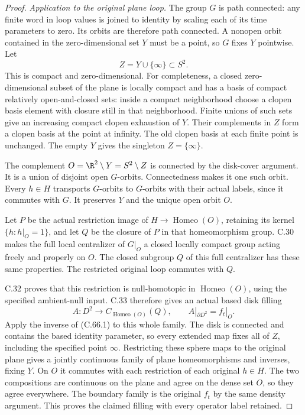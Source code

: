 \begin{proof}
\emph{Application to the original plane loop.}
The group $G$ is path connected: any finite word
in loop values is joined to identity by scaling
each of its time parameters to zero. Its orbits
are therefore path connected. A nonopen orbit
contained in the zero-dimensional set $Y$
must be a point, so $G$ fixes $Y$ pointwise.
Let
\[
                  Z=Y\cup\{\infty\}\subset S^2 .
                                                               \tag{C.66.6}
\]
This is compact and zero-dimensional. For
completeness, a closed zero-dimensional subset
of the plane is locally compact and has a basis
of compact relatively open-and-closed sets:
inside a compact neighborhood choose a clopen
basis element with closure still in that
neighborhood. Finite unions of such sets give
an increasing compact clopen exhaustion of $Y$.
Their complements in $Z$ form a clopen basis
at the point at infinity. The old clopen basis
at each finite point is unchanged. The empty
$Y$ gives the singleton $Z=\{\infty\}$.

The complement $O=\R^2\setminus Y=S^2\setminus Z$
is connected by the disk-cover argument.
It is a union of disjoint open $G$-orbits.
Connectedness makes it one such orbit.
Every $h\in H$ transports $G$-orbits to $G$-orbits
with their actual labels, since it commutes
with $G$. It preserves $Y$ and the unique open
orbit $O$.

Let $P$ be the actual restriction image of
$H\to\operatorname{Homeo}(O)$, retaining its
kernel $\{h:h|_O=1\}$, and let $Q$ be the
closure of $P$ in that homeomorphism group.
C.30 makes the full local centralizer of
$G|_O$ a closed locally compact group acting
freely and properly on $O$. The closed subgroup
$Q$ of this full centralizer has these same
properties. The restricted original loop
commutes with $Q$.

C.32 proves that this restriction is null-homotopic
in $\operatorname{Homeo}(O)$, using the specified
ambient-null input. C.33 therefore gives an actual
based disk filling
\[
 A:D^2\longrightarrow
          C_{\operatorname{Homeo}(O)}(Q),
       \qquad A|_{\partial D^2}=f_t|_O .
                                                               \tag{C.66.7}
\]
Apply the inverse of (C.66.1) to this whole family.
The disk is connected and contains the based
identity parameter, so every extended map fixes
all of $Z$, including the specified point
$\infty$. Restricting these sphere maps to the
original plane gives a jointly continuous family
of plane homeomorphisms and inverses, fixing $Y$.
On $O$ it commutes with each restriction of
each original $h\in H$. The two compositions
are continuous on the plane and agree on the
dense set $O$, so they agree everywhere.
The boundary family is the original $f_t$ by
the same density argument. This proves the
claimed filling with every operator label retained.


\end{proof}
